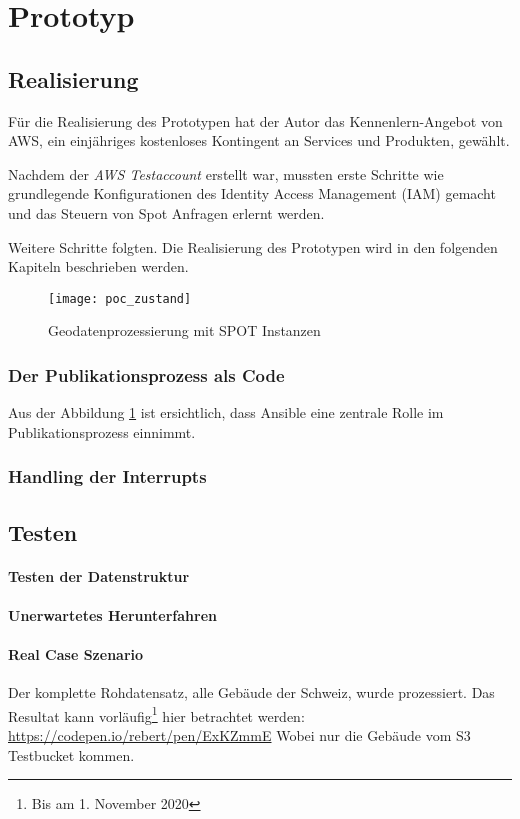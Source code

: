 \section{Prototyp}
\subsection{Realisierung}
Für die Realisierung des Prototypen hat der Autor das Kennenlern-Angebot von AWS, ein einjähriges kostenloses Kontingent an Services und Produkten\cite{FreeTier2020}, gewählt. 

Nachdem der \emph{AWS Testaccount} erstellt war, mussten erste Schritte wie grundlegende Konfigurationen des Identity Access Management (IAM) gemacht und das Steuern von Spot Anfragen erlernt werden.

Weitere Schritte folgten. Die Realisierung des Prototypen wird in den folgenden Kapiteln beschrieben werden.

\begin{figure}[H]
	\centering
	\texttt{[image: poc\_zustand]}
	\caption{Geodatenprozessierung mit SPOT Instanzen}
	\label{fig:ist_zustand}
\end{figure}

\subsubsection{Der Publikationsprozess als Code}
Aus der Abbildung \ref{fig:ist_zustand} ist ersichtlich, dass Ansible eine zentrale Rolle im Publikationsprozess einnimmt. 

\subsubsection{Handling der Interrupts}



\subsection{Testen}

\paragraph{Testen der Datenstruktur}


\paragraph{Unerwartetes Herunterfahren}


\paragraph{Real Case Szenario}

Der komplette Rohdatensatz, alle Gebäude der Schweiz, wurde prozessiert. Das Resultat kann vorläufig\footnote{Bis am 1. November 2020} hier betrachtet werden:
\href{https://codepen.io/rebert/pen/ExKZmmE}{https://codepen.io/rebert/pen/ExKZmmE} Wobei nur die Gebäude vom S3 Testbucket kommen.
